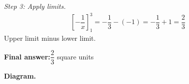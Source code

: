 \documentclass[11pt]{article}
\begin{document}
\textit{Step 3: Apply limits.}
\[\begin{gathered}
\left[-\dfrac{1}{x}\right]_1^3 = -\dfrac{1}{3} - (-1) = -\dfrac{1}{3} + 1 = \dfrac{2}{3}
\end{gathered}\]
Upper limit minus lower limit.

\begin{answerbox}
\textbf{Final answer:}\quad \(\displaystyle \dfrac{2}{3}\) square units
\end{answerbox}
\textbf{Diagram.}

\begin{center}
\end{center}
\end{document}
